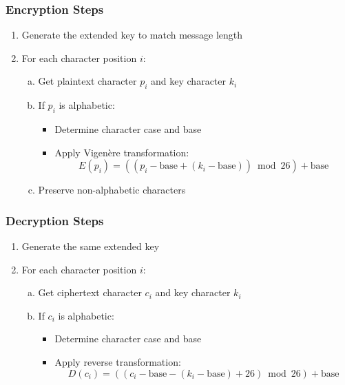 \documentclass[titlepage]{article}
\begin{document}
\subsubsection{ Encryption Steps}
\begin{enumerate}[1.]
\item Generate the extended key to match message length
\item For each character position $i$:
   \begin{enumerate}[a)]
   \item Get plaintext character $p_i$ and key character $k_i$
   \item If $p_i$ is alphabetic:
      \begin{itemize}
      \item Determine character case and base
      \item Apply Vigenère transformation:
         \begin{equation}
         E(p_i) = ((p_i - \text{base} + (k_i - \text{base})) \bmod 26) + \text{base}
         \end{equation}
      \end{itemize}
   \item Preserve non-alphabetic characters
   \end{enumerate}
\end{enumerate}

\subsubsection{ Decryption Steps}
\begin{enumerate}[1.]
\item Generate the same extended key
\item For each character position $i$:
   \begin{enumerate}[a)]
   \item Get ciphertext character $c_i$ and key character $k_i$
   \item If $c_i$ is alphabetic:
      \begin{itemize}
      \item Determine character case and base
      \item Apply reverse transformation:
         \begin{equation}
         D(c_i) = ((c_i - \text{base} - (k_i - \text{base}) + 26) \bmod 26) + \text{base}
         \end{equation}
      \end{itemize}
   \end{enumerate}
\end{enumerate}
\end{document}
